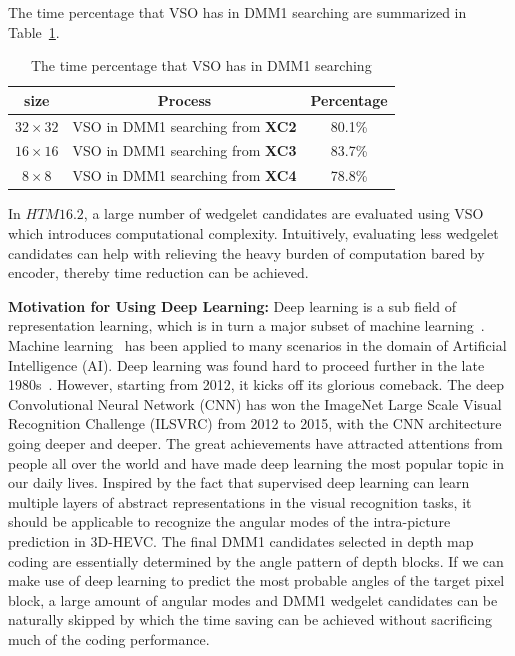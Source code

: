 The time percentage that VSO has in DMM1 searching are summarized in
Table~\ref{tab:vso-in-dmm1-searching-time-percent-summary}.
\begin{table}[t]
    \caption{The time percentage that VSO has in DMM1 searching}
    \bigskip\label{tab:vso-in-dmm1-searching-time-percent-summary}
    \centering
    \begin{tabular}{c c c}
        \toprule
        size & Process & Percentage\\
        \midrule
        \(32\times32\)  & VSO in DMM1 searching from \textbf{XC2} & 80.1\% \\
        \(16\times16\) & VSO in DMM1 searching from \textbf{XC3} & 83.7\% \\
        \(8\times8\) & VSO in DMM1 searching from \textbf{XC4} & 78.8\% \\
        \bottomrule
    \end{tabular}
\end{table}
In \(HTM16.2\), a large number of wedgelet candidates are 
evaluated using VSO which
introduces computational complexity.
Intuitively, evaluating less wedgelet candidates can help with relieving
the heavy burden of computation bared by encoder,
thereby time reduction can be achieved.

\textbf{Motivation for Using Deep Learning:} Deep learning 
is a sub field of representation learning, which
is in turn a major subset of machine learning~\parencite{RN158}.
Machine learning~\parencite{RN198}
has been applied to many scenarios in the domain of Artificial Intelligence (AI).
Deep learning was found hard to proceed further
in the late 1980s~\parencite{RN199}.
However, starting from 2012, it kicks off its
glorious comeback.
The deep Convolutional Neural Network (CNN) has won the ImageNet
Large Scale Visual Recognition Challenge (ILSVRC)
from 2012 to 2015, with the CNN architecture going deeper
and deeper.
The great achievements have attracted attentions from 
people all over the world and
have made deep learning the most popular topic in our daily lives.
Inspired by the fact that supervised deep learning can learn multiple layers of
abstract representations in the visual recognition tasks, it should
be applicable to recognize the angular modes of the intra-picture
prediction in 3D-HEVC\@.
The final DMM1 candidates selected in depth map coding
are essentially determined by the angle pattern of depth blocks.
If we can make use of deep learning to predict the most probable angles of the
target pixel block, a large amount of angular modes and DMM1
wedgelet candidates can be naturally skipped by which the time saving can be
achieved without sacrificing much of the coding performance.

